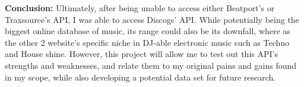 \documentclass{article}
\begin{document}
\textbf{Conclusion:} Ultimately, after being unable to access either Beatport's or Traxsource's API, I was able to access Discogs' API. While potentially being the biggest online database of music, its range could also be its downfall, where as the other 2 website's specific niche in DJ-able electronic music such as Techno and House shine. However, this project will allow me to test out this API's strengths and weaknesses, and relate them to my original pains and gains found in my scope, while also developing a potential data set for future research.
\end{document}
